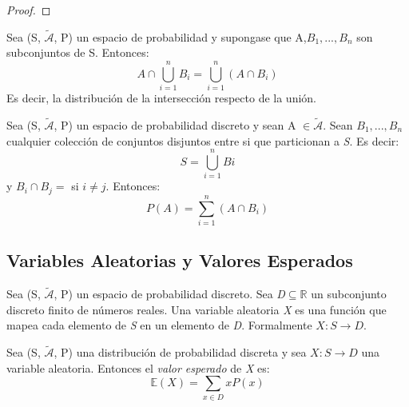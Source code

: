 \begin{proof}
\end{proof}


\begin{lem} Sea (S, $\mathcal{\tilde{A}}$, P) un espacio de probabilidad y supongase que A,$B_{1},..., B_{n}$ son subconjuntos de S. Entonces:
	\begin{equation}\label{AcapcupBi}
	A\cap\bigcup\limits_{i=1}^nB_{i}	= \bigcup\limits_{i=1}^n(A\cap B_{i})
	\end{equation}
Es decir, la distribución de la intersección respecto de la unión.
\end{lem}

\begin{thm}Sea (S, $\mathcal{\tilde{A}}$, P) un espacio de probabilidad discreto y sean A $\in \mathcal{\tilde{A}}$. Sean $B_{1},..., B_{n}$ cualquier colección de conjuntos disjuntos entre si que particionan a \textit{S}. Es decir: \begin{equation}\label{cup Bi}
	S= \bigcup \limits_{i=1}^n Bi
	\end{equation}
 y $B_{i}\cap B_{j}=$ si $i\neq j$. Entonces:\begin{equation}\label{pA2} P(A)= \sum\limits_{i=1}^n(A\cap B_{i})
 \end{equation}
\end{thm}

\subsection{Variables Aleatorias y Valores Esperados}

\begin{defn} Sea (S, $\mathcal{\tilde{A}}$, P) un espacio de probabilidad discreto. Sea \textit{D$\subseteq\mathbb{R}$} un subconjunto discreto finito de números reales. Una variable aleatoria \textit{X} es una función que mapea cada elemento de \textit{S} en un elemento de \textit{D}. Formalmente \textit{$X:S\longrightarrow D$}.
\end{defn}

\begin{defn} Sea (S, $\mathcal{\tilde{A}}$, P) una distribución de probabilidad discreta y sea \textit{$X:S\longrightarrow D$} una variable aleatoria. Entonces el \textit{valor esperado} de \textit{X} es:
	\begin{equation}\label{esp}
	\mathbb{E}(X)=\sum\limits_{x\in D}xP(x)
	\end{equation}
\end{defn}

